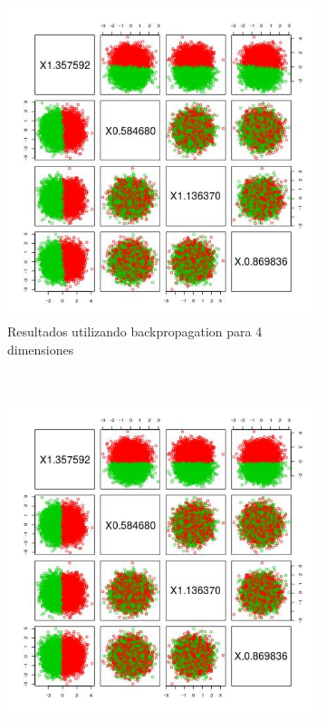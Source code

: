 \documentclass[12pt, a4paper]{article}
\begin{document}
\begin{figure}
    \centering

~ %
    \begin{subfigure}[b]{0.45\textwidth}
        \includegraphics[width=\textwidth]{prediccionB4}
        \caption{Resultados utilizando backpropagation para 4 dimensiones}  
    \end{subfigure}
      ~ %
    \begin{subfigure}[b]{0.45\textwidth}
        \includegraphics[width=\textwidth]{prediccionB4tree}

\end{subfigure}
\end{figure}
\end{document}

